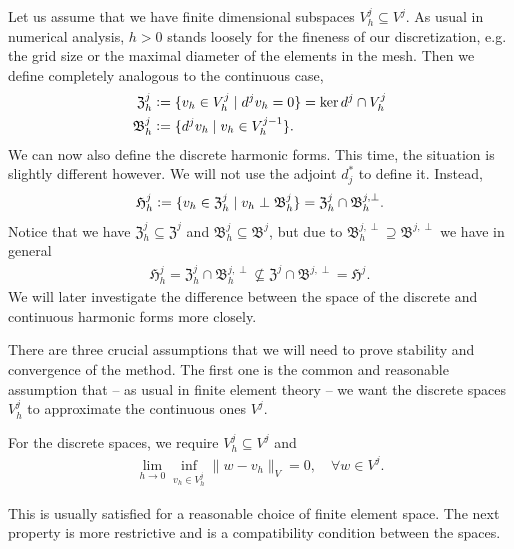 \documentclass[../master_thesis.tex]{subfiles}
\begin{document}
Let us assume that we have finite dimensional subspaces $V_h^j \subseteq V^j$. 
As usual in numerical analysis, $h>0$ stands loosely for the fineness of our discretization, 
e.g. the grid size or the maximal diameter of the elements in the mesh.
Then we define completely analogous to the continuous case,
\begin{align*}
    \mathfrak{Z}_h^j &\vcentcolon= \{ v_h \in V_h^j \mid d^j v_h = 0 \} = \ker d^j \cap V^j_h
    \\ \mathfrak{B}^j_h &\vcentcolon= \{ d^j v_h \mid v_h \in V_h^{j-1} \}.
\end{align*}
We can now also define the discrete harmonic forms. This time, the situation is slightly 
different however. We will not use the adjoint $d^*_j$ to define it.
Instead,
\begin{align*}
    \mathfrak{H}_h^j \vcentcolon= \{ v_h \in \mathfrak{Z}_h^j \mid v_h \perp \mathfrak{B}^j_h \}
        = \mathfrak{Z}_h^j \cap \mathfrak{B}_h^{j,\perp}.
\end{align*}
Notice that we have $\mathfrak{Z}_h^j \subseteq \mathfrak{Z}^j$ and 
$\mathfrak{B}_h^j \subseteq \mathfrak{B}^j$, but due to 
$\mathfrak{B}_h^{j,\perp} \supseteq \mathfrak{B}^{j,\perp}$ we have in general
\begin{align*}
    \mathfrak{H}^j_h = \mathfrak{Z}_h^j \cap \mathfrak{B}_h^{j,\perp} 
    \not\subseteq    \mathfrak{Z}^j \cap \mathfrak{B}^{j,\perp} = \mathfrak{H}^j.
\end{align*}
We will later investigate the difference between the space of the discrete and continuous 
harmonic forms more closely.

There are three crucial assumptions that we will need to prove stability and convergence 
of the method. The first one is the common and reasonable assumption that 
-- as usual in finite element theory -- we want the discrete spaces $V_h^j$
to approximate the continuous ones $V^j$. 
\begin{assumption}\label{ass:convergence_discrete_spaces}
    For the discrete spaces, we require $V_h^j \subseteq V^j$ and
    \begin{align*}
        \lim_{h \rightarrow 0} \inf_{v_h \in V_h^j} \lVert w - v_h \rVert _V= 0, \quad \forall w \in V^j.
    \end{align*}    
\end{assumption}
This is usually satisfied for a reasonable choice of finite element space.
The next property is more restrictive and is a compatibility condition between the spaces.
\end{document}
